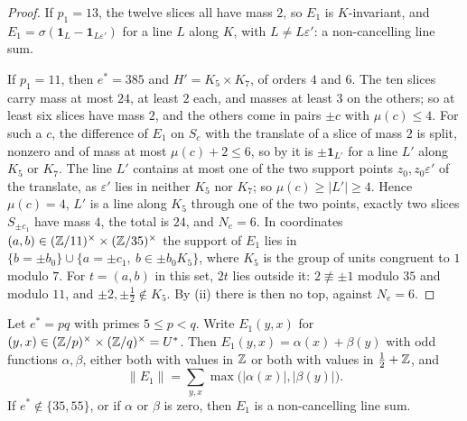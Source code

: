 \begin{proof}
If $p_{1}=13$, the twelve slices all have mass $2$, so $E_{1}$ is
$K$-invariant, and $E_{1}=\sigma(\mathbf 1_{L}-\mathbf 1_{L\varepsilon'})$ for
a line $L$ along $K$, with $L\ne L\varepsilon'$: a non-cancelling line sum.

If $p_{1}=11$, then $e^{*}=385$ and $H'=K_{5}\times K_{7}$, of orders $4$
and $6$. The ten slices carry mass at most $24$, at least $2$ each, and
masses at least $3$ on the others; so at least six slices have mass $2$, and
the others come in pairs $\pm c$ with $\mu(c)\le4$. For such a $c$, the
difference of $E_{1}$ on $S_{c}$ with the translate of a slice of mass $2$ is
split, nonzero and of mass at most $\mu(c)+2\le6$, so by  it
is $\pm\mathbf 1_{L'}$ for a line $L'$ along $K_{5}$ or $K_{7}$. The line
$L'$ contains at most one of the two support points
$z_{0},z_{0}\varepsilon'$ of the translate, as $\varepsilon'$ lies in neither
$K_{5}$ nor $K_{7}$; so $\mu(c)\ge|L'|\ge4$. Hence $\mu(c)=4$, $L'$ is a line along
$K_{5}$ through one of the two points, exactly two slices $S_{\pm c_{1}}$ have
mass $4$, the total is $24$, and $N_{e}=6$. In coordinates $(a,b)\in
(\mathbb{Z}/11)^{\times}\times(\mathbb{Z}/35)^{\times}$ the support of $E_{1}$ lies in
$\{b=\pm b_{0}\}\cup\{a=\pm c_{1},\ b\in\pm b_{0}K_{5}\}$, where $K_{5}$ is
the group of units congruent to $1$ modulo $7$. For $t=(a,b)$ in this set,
$2t$ lies outside it: $2\not\equiv\pm1$ modulo $35$ and modulo $11$, and
$\pm2,\pm\frac12\notin K_{5}$. By (ii) there is then no
top, against $N_{e}=6$.
\end{proof}

\begin{proposition}\label{prop:twoprimes}
Let $e^{*}=pq$ with primes $5\le p<q$. Write $E_{1}(y,x)$ for
$(y,x)\in(\mathbb{Z}/p)^{\times}\times(\mathbb{Z}/q)^{\times}=U^{*}$. Then
$E_{1}(y,x)=\alpha(x)+\beta(y)$ with odd functions $\alpha,\beta$, either both
with values in $\mathbb{Z}$ or both with values in $\frac12+\mathbb{Z}$, and
\[
  \|E_{1}\|=\sum_{y,x}\max\bigl(|\alpha(x)|,|\beta(y)|\bigr).
\]
If $e^{*}\notin\{35,55\}$, or if $\alpha$ or $\beta$ is zero, then $E_{1}$ is
a non-cancelling line sum.
\end{proposition}

